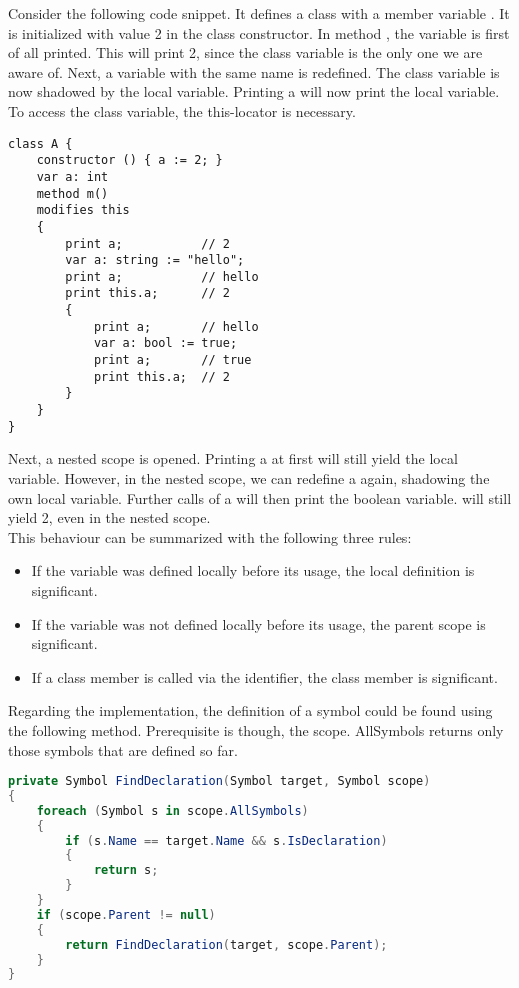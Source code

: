 Consider the following code snippet. It defines a class with a member variable . It is initialized with value 2 in the class constructor. In method , the variable  is first of all printed. This will print 2, since the class variable is the only one we are aware of. Next, a variable with the same name is redefined. The class variable is now shadowed by the local variable. Printing a will now print the local variable. To access the class variable, the this-locator is necessary.

\begin{lstlisting}[language = dafny, caption={Complex Shadowing Example}, captionpos=b, label={lst:shadowing}]
class A {
    constructor () { a := 2; }
    var a: int
    method m()
    modifies this
    {
        print a;           // 2
        var a: string := "hello";
        print a;           // hello
        print this.a;      // 2
        {
            print a;       // hello
            var a: bool := true;
            print a;       // true
            print this.a;  // 2
        }
    }
}
\end{lstlisting}

Next, a nested scope is opened. Printing a at first will still yield the local variable. However, in the nested scope, we can redefine a again, shadowing the own local variable. Further calls of a will then print the boolean variable.  will still yield 2, even in the nested scope.\\

This behaviour can be summarized with the following three rules:
\begin{itemize}
    \item If the variable was defined locally before its usage, the local definition is significant.
    \item If the variable was not defined locally before its usage, the parent scope is significant.
    \item If a class member is called via the  identifier, the class member is significant.
\end{itemize}

Regarding the implementation, the definition of a symbol could be found using the following method. Prerequisite is though, the scope. AllSymbols returns only those symbols that are defined so far.


\begin{lstlisting}[language=csharp, caption={Finding Symbol Definition}, captionpos=b, label={lst:findsymbol}]
private Symbol FindDeclaration(Symbol target, Symbol scope)
{
    foreach (Symbol s in scope.AllSymbols)
    {
        if (s.Name == target.Name && s.IsDeclaration)
        {
            return s;
        }
    }
    if (scope.Parent != null)
    {
        return FindDeclaration(target, scope.Parent);
    }
}
\end{lstlisting}

